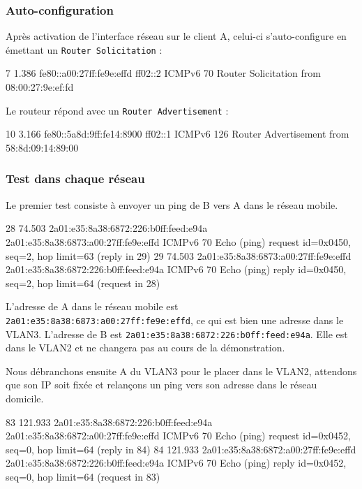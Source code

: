 \subsubsection{Auto-configuration}


Après activation de l'interface réseau sur le client A, celui-ci s'auto-configure en émettant un \texttt{Router Solicitation} :

\begin{paquet}
7	1.386	fe80::a00:27ff:fe9e:effd	ff02::2	ICMPv6	70	Router Solicitation from 08:00:27:9e:ef:fd
\end{paquet}

Le routeur répond avec un \texttt{Router Advertisement} :

\begin{paquet}
10	3.166	fe80::5a8d:9ff:fe14:8900	ff02::1	ICMPv6	126	Router Advertisement from 58:8d:09:14:89:00
\end{paquet}

\subsubsection{Test dans chaque réseau}

Le premier test consiste à envoyer un ping de B vers A dans le réseau mobile.

\begin{paquet}
28	74.503	2a01:e35:8a38:6872:226:b0ff:feed:e94a	2a01:e35:8a38:6873:a00:27ff:fe9e:effd	ICMPv6	70	Echo (ping) request id=0x0450, seq=2, hop limit=63 (reply in 29)
29	74.503	2a01:e35:8a38:6873:a00:27ff:fe9e:effd	2a01:e35:8a38:6872:226:b0ff:feed:e94a	ICMPv6	70	Echo (ping) reply id=0x0450, seq=2, hop limit=64 (request in 28)
\end{paquet}

L'adresse de A dans le réseau mobile est \texttt{2a01:e35:8a38:6873:a00:27ff:fe9e:effd}, ce qui est bien une adresse dans le VLAN3.
L'adresse de B est \texttt{2a01:e35:8a38:6872:226:b0ff:feed:e94a}.
Elle est dans le VLAN2 et ne changera pas au cours de la démonstration.

Nous débranchons ensuite A du VLAN3 pour le placer dans le VLAN2, attendons que son IP soit fixée et relançons un ping vers son adresse dans le réseau domicile.

\begin{paquet}
83	121.933	2a01:e35:8a38:6872:226:b0ff:feed:e94a	2a01:e35:8a38:6872:a00:27ff:fe9e:effd	ICMPv6	70	Echo (ping) request id=0x0452, seq=0, hop limit=64 (reply in 84)
84	121.933	2a01:e35:8a38:6872:a00:27ff:fe9e:effd	2a01:e35:8a38:6872:226:b0ff:feed:e94a	ICMPv6	70	Echo (ping) reply id=0x0452, seq=0, hop limit=64 (request in 83)
\end{paquet}

